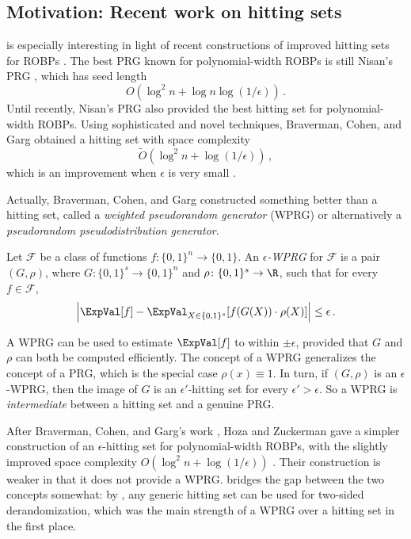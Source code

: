 \subsection{Motivation: Recent work on hitting sets}

 is especially interesting in light of recent constructions of improved hitting sets for ROBPs \cite{BCG20, HZ20, CL20}. The best PRG known for polynomial-width ROBPs is still Nisan's PRG \cite{Nis92}, which has seed length
$$
O(\log^2 n + \log n \log(1/\epsilon))\,.
$$
Until recently, Nisan's PRG also provided the best hitting set for polynomial-width ROBPs. Using sophisticated and novel techniques, Braverman, Cohen, and Garg obtained a hitting set with space complexity
$$
\widetilde{O}(\log^2 n + \log(1/\epsilon))\,,
$$
which is an improvement when $\epsilon$ is very small \cite{BCG20}.

Actually, Braverman, Cohen, and Garg constructed something better than a hitting set, called a \emph{weighted pseudorandom generator} (WPRG) or alternatively a \emph{pseudorandom pseudodistribution generator}.
\begin{definition}
Let $\mathcal{F}$ be a class of functions $f \colon \{0, 1\}^n \to \{0, 1\}$. An \emph{$\epsilon$-WPRG} for $\mathcal{F}$ is a pair $(G, \rho)$, where $G \colon \{0, 1\}^s \to \{0, 1\}^n$ and $\rho \colon \{0, 1\}^s \to \R$, such that for every $f \in \mathcal{F}$,
\[
\left|\ExpVal[f] - \ExpVal_{X \in \{0, 1\}^s}[f(G(X)) \cdot \rho(X)]\right| \leq \epsilon\,.
\]
\end{definition}
A WPRG can be used to estimate $\ExpVal[f]$ to within $\pm \epsilon$, provided that $G$ and $\rho$ can both be computed efficiently. The concept of a WPRG generalizes the concept of a PRG, which is the special case $\rho(x) \equiv 1$. 
In turn, if $(G, \rho)$ is an $\epsilon$-WPRG, then the image of $G$ is an $\epsilon'$-hitting set for every $\epsilon' > \epsilon$. So a WPRG is \emph{intermediate} between a hitting set and a genuine PRG.

After Braverman, Cohen, and Garg's work \cite{BCG20}, Hoza and Zuckerman gave a simpler construction of an $\epsilon$-hitting set for polynomial-width ROBPs, with the slightly improved space complexity $O(\log^2 n + \log(1/\epsilon))$ \cite{HZ20}. Their construction is weaker in that it does not provide a WPRG.  bridges the gap between the two concepts somewhat: by , any generic hitting set can be used for two-sided derandomization, which was the main strength of a WPRG over a hitting set in the first place.

